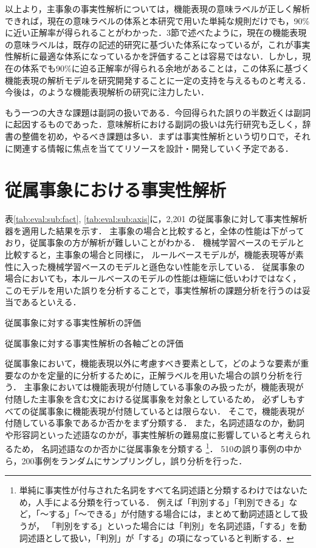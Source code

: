 \documentclass[japanese]{jnlp_1.4}
\begin{document}
以上より，主事象の事実性解析については，機能表現の意味ラベルが正しく解析できれば，現在の意味ラベルの体系と本研究で用いた単純な規則だけでも，90\%に近い正解率が得られることがわかった．3節で述べたように，現在の機能表現の意味ラベルは，既存の記述的研究に基づいた体系になっているが，これが事実性解析に最適な体系になっているかを評価することは容易ではない．しかし，現在の体系でも90\%に迫る正解率が得られる余地があることは，この体系に基づく機能表現の解析モデルを研究開発することに一定の支持を与えるものと考える．今後は，のような機能表現解析の研究に注力したい．

もう一つの大きな課題は副詞の扱いである．今回得られた誤りの半数近くは副詞に起因するものであった．意味解析における副詞の扱いは先行研究も乏しく，辞書の整備を初め，やるべき課題は多い．まずは事実性解析という切り口で，それに関連する情報に焦点を当ててリソースを設計・開発していく予定である．


\section{従属事象における事実性解析}
\label{sec_subord}

表\ref{tab:eval:sub:fact}, \ref{tab:eval:sub:axis}に，2,201
の従属事象に対して事実性解析器を適用した結果を示す．
主事象の場合と比較すると，全体の性能は下がっており，従属事象の方が解析が難しいことがわかる．
機械学習ベースのモデルと比較すると，主事象の場合と同様に，
ルールベースモデルが，機能表現等が素性に入った機械学習ベースのモデルと遜色ない性能を示している．
従属事象の場合においても，本ルールベースのモデルの性能は極端に低いわけではなく，
このモデルを用いた誤りを分析することで，事実性解析の課題分析を行うのは妥当であるといえる．

\begin{table}[b]
\caption{従属事象に対する事実性解析の評価}
\label{tab:eval:sub:fact}

\end{table}
\begin{table}[b]
\caption{従属事象に対する事実性解析の各軸ごとの評価}
\label{tab:eval:sub:axis}

\end{table}

従属事象において，機能表現以外に考慮すべき要素として，どのような要素が重要なのかを定量的に分析するために，正解ラベルを用いた場合の誤り分析を行う．
主事象においては機能表現が付随している事象のみ扱ったが，機能表現が付随した主事象を含む文における従属事象を対象としているため，
必ずしもすべての従属事象に機能表現が付随しているとは限らない．
そこで，機能表現が付随している事象であるか否かをまず分類する．
また，名詞述語なのか，動詞や形容詞といった述語なのかが，事実性解析の難易度に影響していると考えられるため，
名詞述語なのか否かに従属事象を分類する
\footnote{単純に事実性が付与された名詞をすべて名詞述語と分類するわけではないため，人手による分類を行っている．
例えば「判別する」「判別できる」など，「〜する」「〜できる」が付随する場合には，まとめて動詞述語として扱うが，
「判別をする」といった場合には「判別」を名詞述語，「する」を動詞述語として扱い，「判別」が「する」の項になっていると判断する．}．
510の誤り事例の中から，200事例をランダムにサンプリングし，誤り分析を行った．
\end{document}

